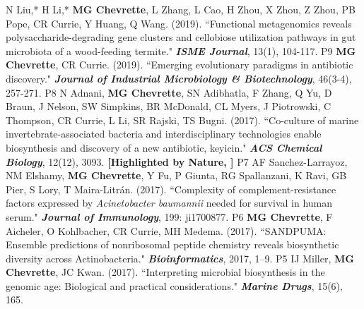 \begin{cvpubs}
  \cvpub
    {N Liu,* H Li,* \textbf{MG Chevrette}, L Zhang, L Cao, H Zhou, X Zhou, Z Zhou, PB Pope, CR Currie, Y Huang, Q Wang. (2019). ``Functional metagenomics reveals polysaccharide-degrading gene clusters and cellobiose utilization pathways in gut microbiota of a wood-feeding termite." \textit{\textbf{ISME Journal}}, 13(1), 104-117. \textbf{\textit{}}     
    } %
    {P9} %
  \cvpub
    {\textbf{MG Chevrette}, CR Currie. (2019). ``Emerging evolutionary paradigms in antibiotic discovery." \textit{\textbf{Journal of Industrial Microbiology \& Biotechnology}}, 46(3-4), 257-271. \textbf{\textit{}}
    } %
    {P8} %
  \cvpub
    {N Adnani, \textbf{MG Chevrette}, SN Adibhatla, F Zhang, Q Yu, D Braun, J Nelson, SW Simpkins, BR McDonald, CL Myers, J Piotrowski, C Thompson, CR Currie, L Li, SR Rajski, TS Bugni. (2017). ``Co-culture of marine invertebrate-associated bacteria and interdisciplinary technologies enable biosynthesis and discovery of a new antibiotic, keyicin." \textit{\textbf{ACS Chemical Biology}}, 12(12), 3093.  \textbf{\textit{}} 
    \linebreak \textbf{[Highlighted by Nature, \textit{}]}
    } %
    {P7} %
  \cvpub
    {AF Sanchez-Larrayoz, NM Elshamy, \textbf{MG Chevrette}, Y Fu, P Giunta, RG Spallanzani, K Ravi, GB Pier, S Lory, T Maira-Litr\'{a}n. (2017). ``Complexity of complement-resistance factors expressed by \textit{Acinetobacter baumannii} needed for survival in human serum." \textit{\textbf{Journal of Immunology}}, 199: ji1700877. \textbf{\textit{}} }%
    {P6} %
  \cvpub
    {\textbf{MG Chevrette}, F Aicheler, O Kohlbacher, CR Currie, MH Medema. (2017). ``SANDPUMA: Ensemble predictions of nonribosomal peptide chemistry reveals biosynthetic diversity across Actinobacteria." \textit{\textbf{Bioinformatics}}, 2017, 1–9. \textbf{\textit{}} } %
    {P5} %
  \cvpub
    {IJ Miller, \textbf{MG Chevrette}, JC Kwan. (2017). ``Interpreting microbial biosynthesis in the genomic age: Biological and practical considerations." \textit{\textbf{Marine Drugs}}, 15(6), 165. \textbf{\textit{}} 
}
\end{cvpubs}
